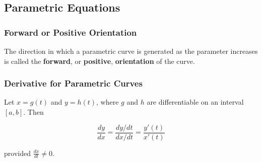 \subsection{Parametric Equations}
\subsubsection{Forward or Positive Orientation}
The direction in which a parametric curve is generated as the parameter increases is called the \textbf{forward}, or \textbf{positive}, \textbf{orientation} of the curve.

\subsubsection{Derivative for Parametric Curves}
Let $x = g(t)$ and $y = h(t)$, where $g$ and $h$ are differentiable on an interval $[a, b]$. Then

\begin{equation}
    \frac{dy}{dx} = \frac{dy/dt}{dx/dt} = \frac{y'(t)}{x'(t)}
\end{equation}

provided $\frac{dx}{dt} \neq 0$.
